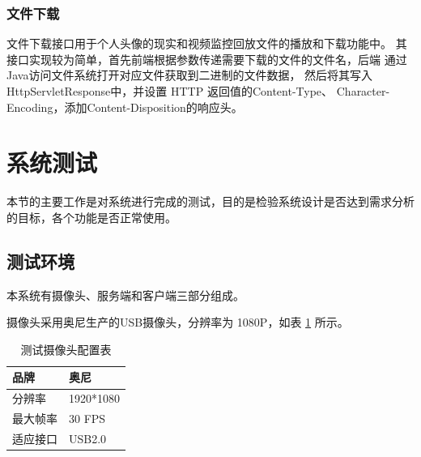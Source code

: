
\subsubsection{文件下载}
文件下载接口用于个人头像的现实和视频监控回放文件的播放和下载功能中。
其接口实现较为简单，首先前端根据参数传递需要下载的文件的文件名，后端
通过Java访问文件系统打开对应文件获取到二进制的文件数据，
然后将其写入HttpServletResponse中，并设置 HTTP 返回值的Content-Type、
Character-Encoding，添加Content-Disposition的响应头。




\section{系统测试}
本节的主要工作是对系统进行完成的测试，目的是检验系统设计是否达到需求分析的目标，各个功能是否正常使用。




\subsection{测试环境}
本系统有摄像头、服务端和客户端三部分组成。

摄像头采用奥尼生产的USB摄像头，分辨率为 1080P，如表 \ref{Tab:cam} 所示。
\begin{longtable}[ht]{|l|l|}
    \caption{测试摄像头配置表}
    \label{Tab:cam}\\
    \hline
    品牌&奥尼\\
    \hline
    分辨率&1920*1080\\
    \hline
    最大帧率&30 FPS\\
    \hline
    适应接口&USB2.0\\
    \hline
    \end{longtable}

